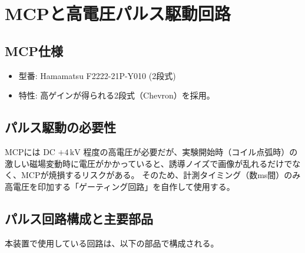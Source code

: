 \section{MCPと高電圧パルス駆動回路}

\subsection{MCP仕様}
\begin{itemize}
    \item 型番: Hamamatsu F2222-21P-Y010 (2段式)
    \item 特性: 高ゲインが得られる2段式（Chevron）を採用。
\end{itemize}

\subsection{パルス駆動の必要性}
MCPには DC $+4\,\mathrm{kV}$ 程度の高電圧が必要だが、実験開始時（コイル点弧時）の激しい磁場変動時に電圧がかかっていると、誘導ノイズで画像が乱れるだけでなく、MCPが焼損するリスクがある。
そのため、計測タイミング（数ms間）のみ高電圧を印加する「ゲーティング回路」を自作して使用する\cite{Takeda2023}。

\subsection{パルス回路構成と主要部品}
本装置で使用している回路は、以下の部品で構成される。

